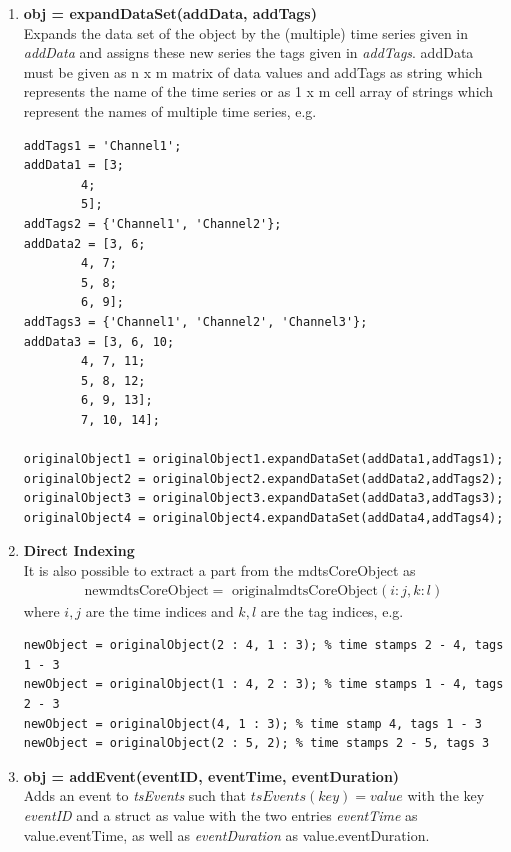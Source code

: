 \documentclass[a4]{scrreprt}
\begin{document}
\begin{enumerate}
\begin{lstlisting}[frame=single]
[startDateNum1, endDateNum1] = originalObject.startEndOfDate(dateString1);
[startDateNum2, endDateNum2] = originalObject.startEndOfDate(dateString2);
[startDateNum3, endDateNum3] = originalObject.startEndOfDate(dateString3);
[startDateNum4, endDateNum4] = originalObject.startEndOfDate(dateString4);
	\end{lstlisting}
\item \textbf{obj = expandDataSet(addData, addTags)}\\
	Expands the data set of the object by the (multiple) time series given in \textit{addData} and assigns these new series the tags given in \textit{addTags}. addData must be given as n x m matrix of data values and addTags as string which represents the name of the time series or as 1 x m cell array of strings which represent the names of multiple time series, e.g.
	\begin{lstlisting}[frame=single]
addTags1 = 'Channel1';
addData1 = [3;
	    4;
	    5];
addTags2 = {'Channel1', 'Channel2'};
addData2 = [3, 6;
	    4, 7;
	    5, 8;
	    6, 9];
addTags3 = {'Channel1', 'Channel2', 'Channel3'};
addData3 = [3, 6, 10;
	    4, 7, 11;
	    5, 8, 12;
	    6, 9, 13];
	    7, 10, 14];
	    
originalObject1 = originalObject1.expandDataSet(addData1,addTags1);
originalObject2 = originalObject2.expandDataSet(addData2,addTags2);
originalObject3 = originalObject3.expandDataSet(addData3,addTags3);
originalObject4 = originalObject4.expandDataSet(addData4,addTags4);
	\end{lstlisting}
\item \textbf{Direct Indexing}\\
It is also possible to extract a part from the mdtsCoreObject as
\begin{align*}
\text{newmdtsCoreObject} = \text{ originalmdtsCoreObject}(i : j, k : l)
\end{align*}
where $i, j$ are the time indices and $k, l$ are the tag indices, e.g.
\begin{lstlisting}[frame=single]
newObject = originalObject(2 : 4, 1 : 3); % time stamps 2 - 4, tags 1 - 3
newObject = originalObject(1 : 4, 2 : 3); % time stamps 1 - 4, tags 2 - 3
newObject = originalObject(4, 1 : 3); % time stamp 4, tags 1 - 3
newObject = originalObject(2 : 5, 2); % time stamps 2 - 5, tags 3
\end{lstlisting}

\item \textbf{obj = addEvent(eventID, eventTime, eventDuration)}\\
	Adds an event to \textit{tsEvents} such that $tsEvents(key) = value$ with the key \textit{eventID} and a struct as value with the two entries \textit{eventTime} as value.eventTime, as well as \textit{eventDuration} as value.eventDuration.


\end{enumerate}
\end{document}
